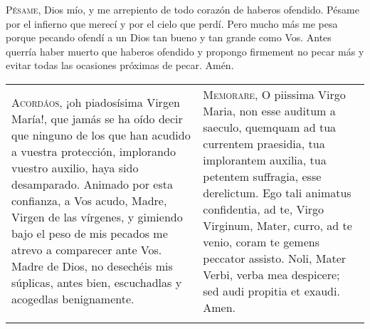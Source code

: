 \documentclass[./rosary.tex]{subfiles}
\begin{document}
\bigskip

\label{condolences}
\textsc{Pésame}, Dios mío, y me arrepiento de todo corazón de haberos ofendido. Pésame por el infierno que merecí y por el cielo que perdí. Pero mucho
más me pesa porque pecando ofendí a un Dios tan bueno y tan grande como Vos. Antes querría haber muerto que haberos ofendido y propongo firmement no pecar
más y evitar todas las ocasiones próximas de pecar. Amén.

\bigskip

\begin{longtable} { p{} p{} }
    \label{memorare}
    \textsc{Acordáos}, ¡oh piadosísima Virgen María!, que jamás se ha oído decir que ninguno de los que han acudido a vuestra protección, 
    implorando vuestro auxilio, haya sido desamparado. Animado por esta confianza, a Vos acudo, Madre, Virgen de las vírgenes, y gimiendo 
    bajo el peso de mis pecados me atrevo a comparecer ante Vos. Madre de Dios, no desechéis mis súplicas, antes bien, escuchadlas y 
    acogedlas benignamente.
        &
    \textsc{Memorare}, O piissima Virgo Maria, non esse auditum a saeculo, quemquam ad tua currentem praesidia, tua implorantem auxilia, 
    tua petentem suffragia, esse derelictum. Ego tali animatus confidentia, ad te, Virgo Virginum, Mater, curro, ad te venio, coram te gemens 
    peccator assisto. Noli, Mater Verbi, verba mea despicere; sed audi propitia et exaudi. Amen.\\\\
    

\end{longtable}
\end{document}
